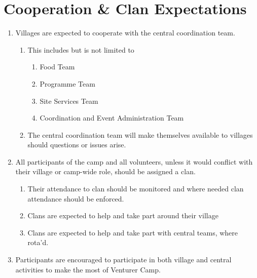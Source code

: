 \documentclass[a4paper, 11pt]{report}
\def\enumMarginIndentOne{4em}
\def\enumMarginIndentTwo{5em}
\begin{document}
    \chapter{Cooperation \& Clan Expectations}
    \begin{enumerate}
        \item Villages are expected to cooperate with the central coordination team.
        \begin{enumerate}[leftmargin=\enumMarginIndentOne]
            \item This includes but is not limited to
            \begin{enumerate}[leftmargin=\enumMarginIndentTwo]
                \item Food Team
                \item Programme Team
                \item Site Services Team
                \item Coordination and Event Administration Team
            \end{enumerate}
            \item The central coordination team will make themselves available to villages should questions or issues arise.
        \end{enumerate}
        \item All participants of the camp and all volunteers, unless it would conflict with their village or camp-wide role, should be assigned a clan.
        \begin{enumerate}[leftmargin=\enumMarginIndentOne]
            \item Their attendance to clan should be monitored and where needed clan attendance should be enforced.
            \item Clans are expected to help and take part around their village
            \item Clans are expected to help and take part with central teams, where rota'd. 
        \end{enumerate}
        \item Participants are encouraged to participate in both village and central activities to make the most of Venturer Camp. 
    \end{enumerate}
\end{document}
